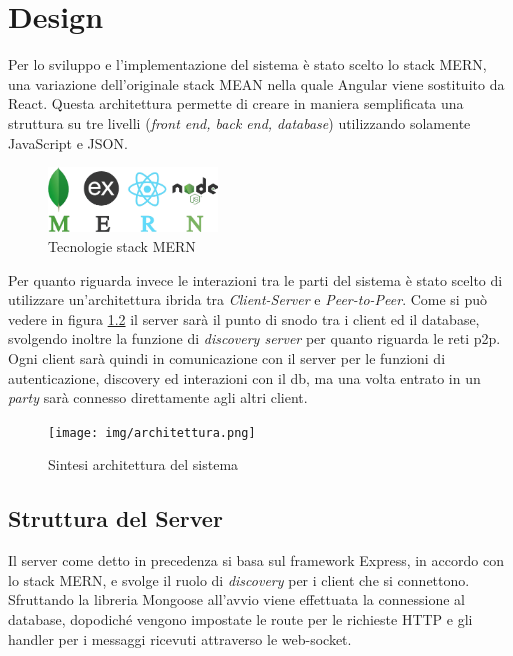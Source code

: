 \chapter{Design}
Per lo sviluppo e l'implementazione del sistema è stato scelto lo stack MERN, una variazione dell'originale stack MEAN \cite{meanWikipedia} nella quale Angular viene sostituito da React. Questa architettura permette di creare in maniera semplificata una struttura su tre livelli (\emph{front end, back end, database}) utilizzando solamente JavaScript e JSON.

\begin{figure}[H]
\centering
\includegraphics[width=0.4\textwidth]{img/logos/MERN-logo.png}
\caption{Tecnologie stack MERN}
\label{fig:mern}
\end{figure}

Per quanto riguarda invece le interazioni tra le parti del sistema è stato scelto di utilizzare un'architettura ibrida tra \emph{Client-Server} e \emph{Peer-to-Peer}. Come si può vedere in figura \ref{fig:architettura} il server sarà il punto di snodo tra i client ed il database, svolgendo inoltre la funzione di \emph{discovery server} per quanto riguarda le reti p2p. Ogni client sarà quindi in comunicazione con il server per le funzioni di autenticazione, discovery ed interazioni con il db, ma una volta entrato in un \emph{party} sarà connesso direttamente agli altri client.

\begin{figure}[H]
\centering
\texttt{[image: img/architettura.png]}
\caption{Sintesi architettura del sistema}
\label{fig:architettura}
\end{figure}


\section{Struttura del Server} \label{serverStruct}

Il server come detto in precedenza si basa sul framework Express, in accordo con lo stack MERN, e svolge il ruolo di \emph{discovery} per i client che si connettono. Sfruttando la libreria Mongoose all'avvio viene effettuata la connessione al database, dopodiché vengono impostate le route per le richieste HTTP e gli handler per i messaggi ricevuti attraverso le web-socket.\\

